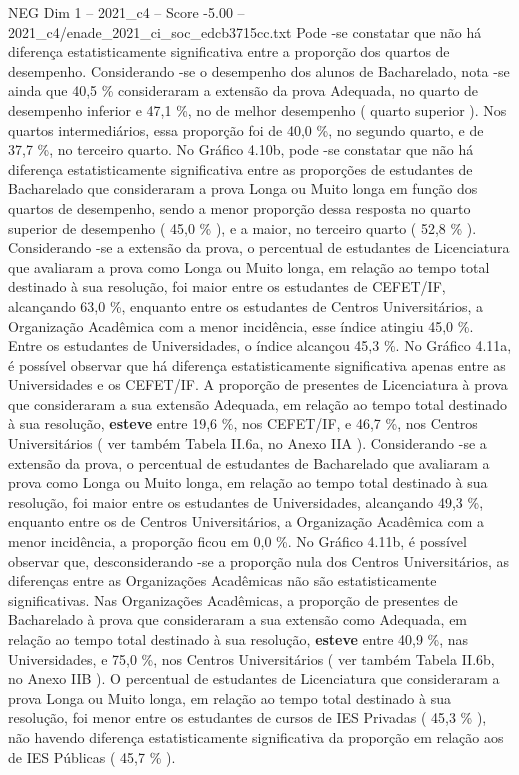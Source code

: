 \begin{textsample}{NEG Dim 1 – 2021\_c4 – Score -5.00 – 2021\_c4/enade\_2021\_ci\_soc\_edcb3715cc.txt}
Pode -se constatar que não há diferença estatisticamente significativa entre a proporção dos quartos de desempenho.
Considerando -se o desempenho dos alunos de Bacharelado, nota -se ainda que 40,5 \% consideraram a extensão da prova Adequada, no quarto de desempenho inferior e 47,1 \%, no de melhor desempenho ( quarto superior ).
Nos quartos intermediários, essa proporção foi de 40,0 \%, no segundo quarto, e de 37,7 \%, no terceiro quarto.
No Gráfico 4.10b, pode -se constatar que não há diferença estatisticamente significativa entre as proporções de estudantes de Bacharelado que consideraram a prova Longa ou Muito longa em função dos quartos de desempenho, sendo a menor proporção dessa resposta no quarto superior de desempenho ( 45,0 \% ), e a maior, no terceiro quarto ( 52,8 \% ).
Considerando -se a extensão da prova, o percentual de estudantes de Licenciatura que avaliaram a prova como Longa ou Muito longa, em relação ao tempo total destinado à sua resolução, foi maior entre os estudantes de CEFET/IF, alcançando 63,0 \%, enquanto entre os estudantes de Centros Universitários, a Organização Acadêmica com a menor incidência, esse índice atingiu 45,0 \%.
Entre os estudantes de Universidades, o índice alcançou 45,3 \%.
No Gráfico 4.11a, é possível observar que há diferença estatisticamente significativa apenas entre as Universidades e os CEFET/IF.
A proporção de presentes de Licenciatura à prova que consideraram a sua extensão Adequada, em relação ao tempo total destinado à sua resolução, \textbf{esteve} entre 19,6 \%, nos CEFET/IF, e 46,7 \%, nos Centros Universitários ( ver também Tabela II.6a, no Anexo IIA ).
Considerando -se a extensão da prova, o percentual de estudantes de Bacharelado que avaliaram a prova como Longa ou Muito longa, em relação ao tempo total destinado à sua resolução, foi maior entre os estudantes de Universidades, alcançando 49,3 \%, enquanto entre os de Centros Universitários, a Organização Acadêmica com a menor incidência, a proporção ficou em 0,0 \%.
No Gráfico 4.11b, é possível observar que, desconsiderando -se a proporção nula dos Centros Universitários, as diferenças entre as Organizações Acadêmicas não são estatisticamente significativas.
Nas Organizações Acadêmicas, a proporção de presentes de Bacharelado à prova que consideraram a sua extensão como Adequada, em relação ao tempo total destinado à sua resolução, \textbf{esteve} entre 40,9 \%, nas Universidades, e 75,0 \%, nos Centros Universitários ( ver também Tabela II.6b, no Anexo IIB ).
O percentual de estudantes de Licenciatura que consideraram a prova Longa ou Muito longa, em relação ao tempo total destinado à sua resolução, foi menor entre os estudantes de cursos de IES Privadas ( 45,3 \% ), não havendo diferença estatisticamente significativa da proporção em relação aos de IES Públicas ( 45,7 \% ).

\end{textsample}
